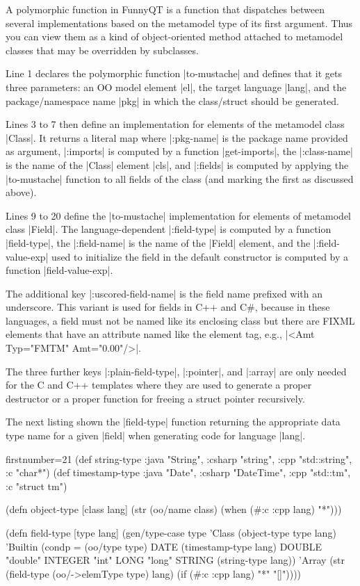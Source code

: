 \documentclass[a4paper]{article}
\newcommand{\code}{\clojureinline}
\begin{document}
A polymorphic function in FunnyQT is a function that dispatches between several
implementations based on the metamodel type of its first argument.  Thus you
can view them as a kind of object-oriented method attached to metamodel classes
that may be overridden by subclasses.

Line 1 declares the polymorphic function \code|to-mustache| and defines that it
gets three parameters: an OO model element \code|el|, the target language
\code|lang|, and the package/namespace name \code|pkg| in which the
class/struct should be generated.

Lines 3 to 7 then define an implementation for elements of the metamodel class
\code|Class|.  It returns a literal map where \code|:pkg-name| is the package
name provided as argument, \code|:imports| is computed by a function
\code|get-imports|, the \code|:class-name| is the name of the \code|Class|
element \code|cls|, and \code|:fields| is computed by applying the
\code|to-mustache| function to all fields of the class (and marking the first
as discussed above).

Lines 9 to 20 define the \code|to-mustache| implementation for elements of
metamodel class \code|Field|.  The language-dependent \code|:field-type| is
computed by a function \code|field-type|, the \code|:field-name| is the name of
the \code|Field| element, and the \code|:field-value-exp| used to initialize
the field in the default constructor is computed by a function
\code|field-value-exp|.

The additional key \code|:uscored-field-name| is the field name prefixed with
an underscore.  This variant is used for fields in C++ and C\#, because in
these languages, a field must not be named like its enclosing class but there
are FIXML elements that have an attribute named like the element tag, e.g.,
\xmlinline|<Amt Typ="FMTM" Amt="0.00"/>|.

The three further keys \code|:plain-field-type|, \code|:pointer|, and
\code|:array| are only needed for the C and C++ templates where they are used
to generate a proper destructor or a proper function for freeing a struct
pointer recursively.

The next listing shown the \code|field-type| function returning the appropriate
data type name for a given \code|field| when generating code for language
\code|lang|.

\begin{clojurecode*}{firstnumber=21}
(def string-type {:java "String", :csharp "string", :cpp "std::string", :c "char*"})
(def timestamp-type {:java "Date", :csharp "DateTime", :cpp "std::tm", :c "struct tm"})

(defn object-type [class lang]
  (str (oo/name class) (when (#{:c :cpp} lang) "*")))

(defn field-type [type lang]
  (gen/type-case type
    'Class   (object-type type lang)
    'Builtin (condp = (oo/type type)
               DATE    (timestamp-type lang)
               DOUBLE  "double"
               INTEGER "int"
               LONG    "long"
               STRING  (string-type lang))
    'Array   (str (field-type (oo/->elemType type) lang)
                  (if (#{:c :cpp} lang) "*" "[]"))))
\end{clojurecode*}
\end{document}
